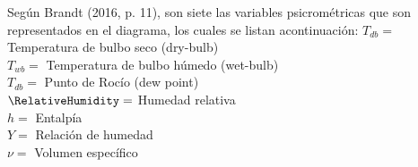 Según Brandt (2016, p. 11), son siete las variables psicrométricas que son representados en el diagrama, los cuales se listan acontinuación: 
$T_{db} = $ Temperatura de bulbo seco (dry-bulb) \\
$T_{wb} = $ Temperatura de bulbo húmedo (wet-bulb) \\
$T_{db} = $ Punto de Rocío (dew point) \\
$\RelativeHumidity = $ Humedad relativa \\
$h = $ Entalpía \\
$Y = $ Relación de humedad \\
$\nu = $ Volumen específico \\